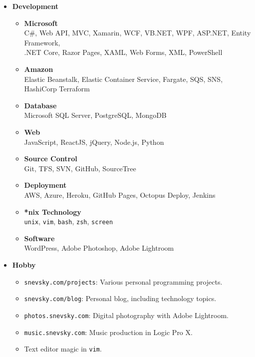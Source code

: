 \documentclass[letterpaper,11pt]{article}
\newcommand{\resitem}[1]{\item #1 \vspace{-2pt}}
\begin{document}
\begin{itemize}

    \item {\bf Development}

        \begin{itemize}
            \resitem{\textbf{Microsoft} \\ C\#, Web API, MVC, Xamarin, WCF, VB.NET, WPF, ASP.NET, 
            Entity Framework, \\ .NET Core, Razor Pages, XAML, Web Forms, XML, PowerShell}
            \resitem{\textbf{Amazon} \\ Elastic Beanstalk, Elastic Container Service, Fargate, SQS, SNS, HashiCorp Terraform}
            \resitem{\textbf{Database} \\ Microsoft SQL Server, PostgreSQL, MongoDB}
            \resitem{\textbf{Web} \\ JavaScript, ReactJS, jQuery, Node.js, Python}
            \resitem{\textbf{Source Control} \\ Git, TFS, SVN, GitHub, SourceTree}
            \resitem{\textbf{Deployment} \\ AWS, Azure, Heroku, GitHub Pages, Octopus Deploy, Jenkins}
            \resitem{\textbf{*nix Technology} \\ \texttt{unix}, \texttt{vim}, \texttt{bash}, \texttt{zsh}, \texttt{screen}}
            \resitem{\textbf{Software} \\ WordPress, Adobe Photoshop, Adobe Lightroom}
        \end{itemize}

    \item {\bf Hobby} 

      \begin{itemize}
          \resitem{\texttt{snevsky.com/projects}: Various personal programming projects.}
          \resitem{\texttt{snevsky.com/blog}: Personal blog, including technology topics.}
          \resitem{\texttt{photos.snevsky.com}: Digital photography with Adobe Lightroom.}
          \resitem{\texttt{music.snevsky.com}: Music production in Logic Pro X.}
          \resitem{Text editor magic in \texttt{vim}.}
      \end{itemize}


\end{itemize}
\end{document}
